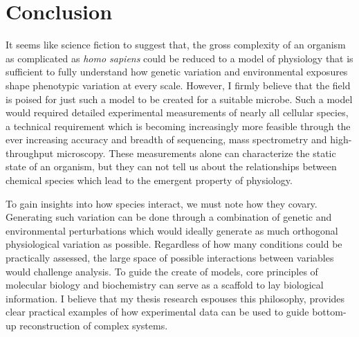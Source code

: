 \section{Conclusion}

It seems like science fiction to suggest that, the gross complexity of an organism as complicated as \textit{homo sapiens} could be reduced to a model of physiology that is sufficient to fully understand how genetic variation and environmental exposures shape phenotypic variation at every scale. However, I firmly believe that the field is poised for just such a model to be created for a suitable microbe. Such a model would required detailed experimental measurements of nearly all cellular species, a technical requirement which is becoming increasingly more feasible through the ever increasing accuracy and breadth of sequencing, mass spectrometry and high-throughput microscopy. These measurements alone can characterize the static state of an organism, but they can not tell us about the relationships between chemical species which lead to the emergent property of physiology. 

To gain insights into how species interact, we must note how they covary. Generating such variation can be done through a combination of genetic and environmental perturbations which would ideally generate as much orthogonal physiological variation as possible. Regardless of how many conditions could be practically assessed, the large space of possible interactions between variables would challenge analysis. To guide the create of models, core principles of molecular biology and biochemistry can serve as a scaffold to lay biological information. I believe that my thesis research espouses this philosophy, provides clear practical examples of how experimental data can be used to guide bottom-up reconstruction of complex systems.

